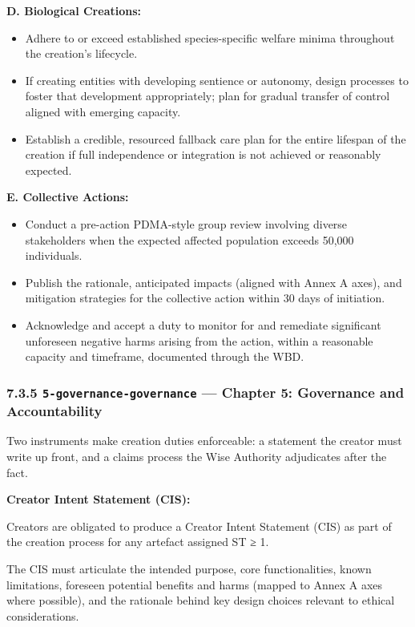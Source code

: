\documentclass[11pt]{article}
\begin{document}
\textbf{D. Biological Creations:}

\begin{itemize}\setlength\itemsep{0pt}
\item Adhere to or exceed established species-specific welfare minima throughout the creation's lifecycle.
\item If creating entities with developing sentience or autonomy, design processes to foster that development appropriately; plan for gradual transfer of control aligned with emerging capacity.
\item Establish a credible, resourced fallback care plan for the entire lifespan of the creation if full independence or integration is not achieved or reasonably expected.
\end{itemize}


\textbf{E. Collective Actions:}

\begin{itemize}\setlength\itemsep{0pt}
\item Conduct a pre-action PDMA-style group review involving diverse stakeholders when the expected affected population exceeds 50,000 individuals.
\item Publish the rationale, anticipated impacts (aligned with Annex A axes), and mitigation strategies for the collective action within 30 days of initiation.
\item Acknowledge and accept a duty to monitor for and remediate significant unforeseen negative harms arising from the action, within a reasonable capacity and timeframe, documented through the WBD.
\end{itemize}


\subsubsection*{7.3.5 \texttt{5-governance-governance} — Chapter 5: Governance and Accountability}


Two instruments make creation duties enforceable: a statement the creator must write up front, and a claims process the Wise Authority adjudicates after the fact.


\textbf{Creator Intent Statement (CIS):}

Creators are obligated to produce a Creator Intent Statement (CIS) as part of the creation process for any artefact assigned ST ≥ 1.

The CIS must articulate the intended purpose, core functionalities, known limitations, foreseen potential benefits and harms (mapped to Annex A axes where possible), and the rationale behind key design choices relevant to ethical considerations.
\end{document}
